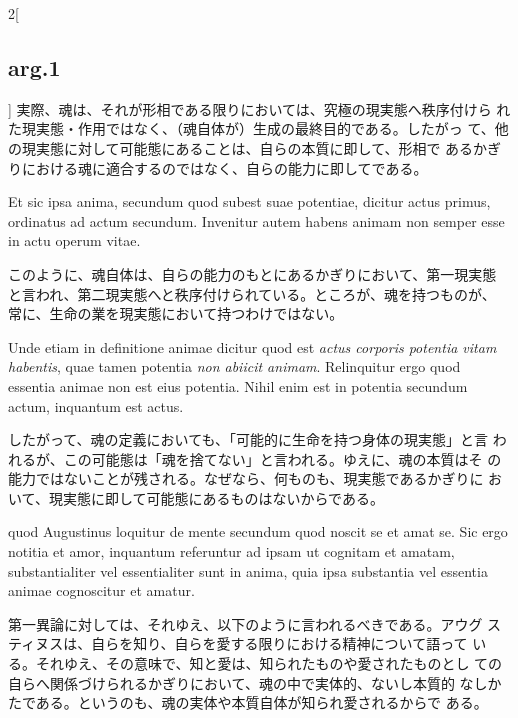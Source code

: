 \documentclass[paper=a4paper,fontsize=10pt,jafontsize=9pt,titlepage]{jlreq}
\begin{document}
\begin{paracol}{2}[\subsection{arg.1}]
 実際、魂は、それが形相である限りにおいては、究極の現実態へ秩序付けら
 れた現実態・作用ではなく、（魂自体が）生成の最終目的である。したがっ
 て、他の現実態に対して可能態にあることは、自らの本質に即して、形相で
 あるかぎりにおける魂に適合するのではなく、自らの能力に即してである。

\switchcolumn*

 Et sic ipsa anima, secundum quod subest suae potentiae, dicitur actus
primus, ordinatus ad actum secundum. Invenitur autem habens animam non
semper esse in actu operum vitae.

\switchcolumn

このように、魂自体は、自らの能力のもとにあるかぎりにおいて、第一現実態
と言われ、第二現実態へと秩序付けられている。ところが、魂を持つものが、
常に、生命の業を現実態において持つわけではない。

\switchcolumn*

Unde etiam in definitione animae dicitur quod est {\itshape actus
corporis potentia vitam habentis}, quae tamen potentia {\itshape non
abiicit animam}. Relinquitur ergo quod essentia animae non est eius
potentia. Nihil enim est in potentia secundum actum, inquantum est
actus.

\switchcolumn

したがって、魂の定義においても、「可能的に生命を持つ身体の現実態」と言
われるが、この可能態は「魂を捨てない」と言われる。ゆえに、魂の本質はそ
の能力ではないことが残される。なぜなら、何ものも、現実態であるかぎりに
おいて、現実態に即して可能態にあるものはないからである。

 quod Augustinus loquitur de mente
secundum quod noscit se et amat se. Sic ergo notitia et amor,
inquantum referuntur ad ipsam ut cognitam et amatam, substantialiter
vel essentialiter sunt in anima, quia ipsa substantia vel essentia
 animae cognoscitur et amatur.

\switchcolumn

 第一異論に対しては、それゆえ、以下のように言われるべきである。アウグ
 スティヌスは、自らを知り、自らを愛する限りにおける精神について語って
 いる。それゆえ、その意味で、知と愛は、知られたものや愛されたものとし
 ての自らへ関係づけられるかぎりにおいて、魂の中で実体的、ないし本質的
 なしかたである。というのも、魂の実体や本質自体が知られ愛されるからで
 ある。



\end{paracol}
\end{document}
